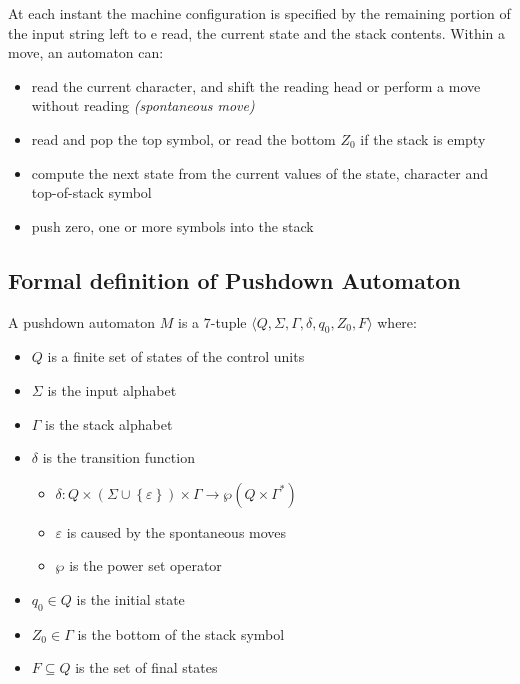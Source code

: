 \documentclass[english]{article}
\begin{document}
At each instant the machine configuration is specified by the remaining portion of the input string left to e read, the current state and the stack contents.
Within a move, an automaton can:

\begin{itemize}
  \item read the current character, and shift the reading head or perform a move without reading \textit{(spontaneous move)}
  \item read and pop the top symbol, or read the bottom \(Z_0\) if the stack is empty
  \item compute the next state from the current values of the state, character and top-of-stack symbol
  \item push zero, one or more symbols into the stack
\end{itemize}

\subsection{Formal definition of Pushdown Automaton}
\label{sec:formal-definition-pda}

A pushdown automaton \(M\) is a \(7\)-tuple \(\langle Q, \Sigma, \Gamma, \delta, q_0, Z_0, F \rangle\) where:

\begin{itemize}
  \item \(Q\) is a finite set of states of the control units
  \item \(\Sigma\) is the input alphabet
  \item \(\Gamma\) is the stack alphabet
  \item \(\delta\) is the transition function
        \begin{itemize}
          \item \(\delta: Q \times \left( \Sigma \cup \left\{ \varepsilon \right\} \right) \times \Gamma \rightarrow \wp \left( Q \times \Gamma^\ast \right)\)
          \item \(\varepsilon\) is caused by the spontaneous moves
          \item \(\wp\) is the power set operator
        \end{itemize}
  \item \(q_0 \in Q\) is the initial state
  \item \(Z_0 \in \Gamma\) is the bottom of the stack symbol
  \item \(F \subseteq Q\) is the set of final states
\end{itemize}
\end{document}
